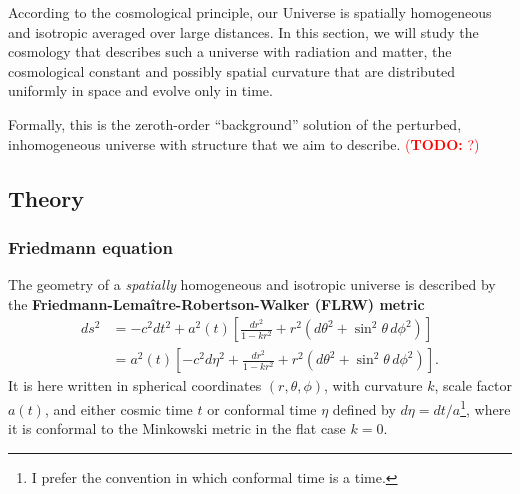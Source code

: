 \documentclass[10pt,a4paper]{article}
\newcommand\TODO[1]{\textcolor{red}{(\textbf{TODO:} #1)}}
\begin{document}
According to the cosmological principle,
our Universe is spatially homogeneous and isotropic averaged over large distances.
In this section, we will study the cosmology that describes such a universe
with radiation and matter, the cosmological constant and possibly spatial curvature
that are distributed uniformly in space and evolve only in time.

Formally, this is the zeroth-order ``background'' solution of the perturbed, inhomogeneous universe with structure that we aim to describe.
\TODO{?} 

\subsection{Theory}

\subsubsection{Friedmann equation}

The geometry of a \emph{spatially} homogeneous and isotropic universe
is described by the \textbf{Friedmann-Lemaître-Robertson-Walker (FLRW) metric}
\begin{equation}
\begin{split}
	ds^2 &= -c^2 dt^2 + a^2(t) \left[\frac{dr^2}{1 - kr^2} + r^2\left(d\theta^2 + \sin^2\theta \, d\phi^2\right) \right] \\
	     &= a^2(t) \left[-c^2 d\eta^2 + \frac{dr^2}{1 - kr^2} + r^2\left(d\theta^2 + \sin^2\theta \, d\phi^2\right) \right].
\end{split}
\label{eq_flrw}
\end{equation}
It is here written in spherical coordinates $(r,\theta,\phi)$, with curvature $k$, scale factor $a(t)$,
and either cosmic time $t$ or conformal time $\eta$ defined by $d\eta = dt/a$\footnote{I prefer the convention in which conformal time is a time.},
where it is conformal to the Minkowski metric in the flat case $k=0$.
\end{document}
